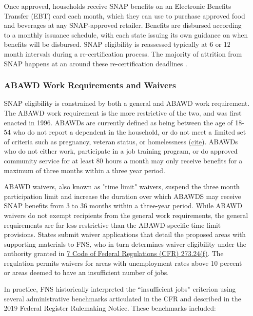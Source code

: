 \documentclass[12pt]{article}
\begin{document}
Once approved, households receive SNAP benefits on an Electronic Benefits Transfer (EBT) card each month, which they can use to purchase approved food and beverages at any SNAP-approved retailer. Benefits are disbursed according to a monthly issuance schedule, with each state issuing its own guidance on when benefits will be disbursed. SNAP eligibility is reassessed typically at 6 or 12 month intervals during a re-certification process. The majority of attrition from SNAP happens at an around these re-certification deadlines \citep{gray2023employed,hastings2018snap}.

\subsubsection{ABAWD Work Requirements and Waivers}

SNAP eligibility is constrained by both a general and ABAWD work requirement. The ABAWD work requirement is the more restrictive of the two, and was first enacted in 1996. ABAWDs are currently defined as being between the age of 18-54 who do not report a dependent in the household, or do not meet a limited set of criteria such as pregnancy, veteran status, or homelessness (\href{https://www.fns.usda.gov/snap/work-requirements}{cite}). ABAWDs who do not either work, participate in a job training program, or do approved community service for at least 80 hours a month may only receive benefits for a maximum of three months within a three year period. 

ABAWD waivers, also known as "time limit" waivers, suspend the three month participation limit and increase the duration over which ABAWDS may receive SNAP benefits from 3 to 36 months within a three-year period. While ABAWD waivers do not exempt recipients from the general work requirements, the general requirements are far less restrictive than the ABAWD-specific time limit provisions. States submit waiver applications that detail the proposed areas with supporting materials to FNS, who in turn determines waiver eligibility under the authority granted in \href{https://www.ecfr.gov/current/title-7/subtitle-B/chapter-II/subchapter-C/part-273/subpart-G/section-273.24#p-273.24(f)}{7 Code of Federal Regulations (CFR) 273.24(f)}. The regulation permits waivers for areas with unemployment rates above 10 percent or areas deemed to have an insufficient number of jobs.

In practice, FNS historically interpreted the ``insufficient jobs'' criterion using several administrative benchmarks articulated in the CFR and described in the 2019 Federal Register Rulemaking Notice. These benchmarks included: 
\end{document}

